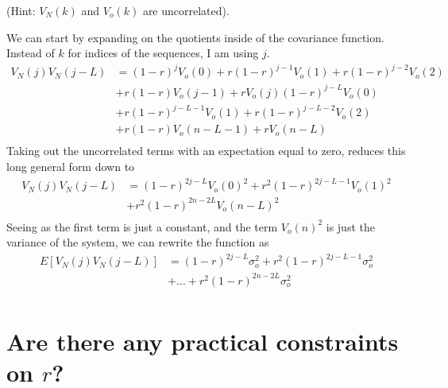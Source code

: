 \documentclass[12pt,letterpaper, onecolumn]{exam}
\begin{document}
\begin{questions}
\begin{parts}
		(Hint: $V_N(k)$ and $V_o(k)$ are uncorrelated).

		\solution
		{We can start by expanding on the quotients inside of the covariance function. Instead of $k$ for indices of the sequences, I am using $j$.
			\begin{equation}
				\begin{split}
					V_N(j)V_N(j-L) & = (1-r)^jV_o(0) + r(1-r)^{j-1}V_o(1) + r(1-r)^{j-2}V_o(2)\\
					& + r(1-r)V_o(j-1) + rV_o(j)(1-r)^{j-L}V_o(0)\\
					& + r(1-r)^{j-L-1}V_o(1) + r(1-r)^{j-L-2}V_o(2)\\
					& + r(1-r)V_o(n-L-1) + rV_o(n-L)\\
				\end{split}
			\end{equation}
			Taking out the uncorrelated terms with an expectation equal to zero, reduces this long general form down to
			\begin{equation}
				\begin{split}
					V_N(j)V_N(j-L) & = (1-r)^{2j-L}V_o(0)^2 + r^2(1-r)^{2j-L-1}V_o(1)^2\\
					& + r^2(1-r)^{2n-2L}V_o(n-L)^2\\
				\end{split}
			\end{equation}
			Seeing as the first term is just a constant, and the term $V_o(n)^2$ is just the variance of the system, we can rewrite the function as
			\begin{equation}
				\begin{split}
					E\left[V_N(j)V_N(j-L)\right] & = (1-r)^{2j-L}\sigma_o^2 + r^2(1-r)^{2j-L-1}\sigma_o^2\\
					& + \dotsc + r^2(1-r)^{2n-2L}\sigma_o^2\\
				\end{split}
			\end{equation}
		}
		\part{Are there any practical constraints on $r$?}\\
	\end{parts}
	\clearpage
	\begin{parts}

\end{parts}
\end{questions}
\end{document}
